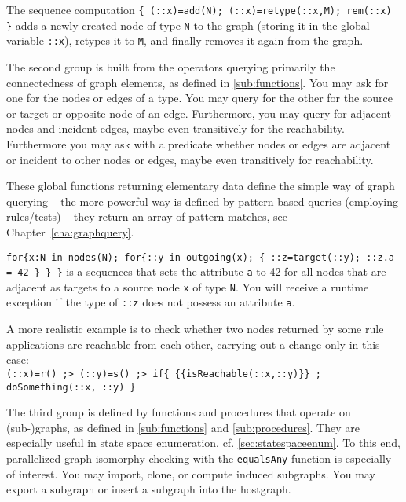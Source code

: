 \begin{example}
The sequence computation \verb#{ (::x)=add(N); (::x)=retype(::x,M); rem(::x) }# adds a newly created node of type \texttt{N} to the graph (storing it in the global variable \verb#::x#), retypes it to \texttt{M}, and finally removes it again from the graph.
\end{example}

The second group is built from the operators querying primarily the connectedness of graph elements,
as defined in \ref{sub:functions}.
You may ask for one for the nodes or edges of a type.
You may query for the other for the source or target or opposite node of an edge.
Furthermore, you may query for adjacent nodes and incident edges,
maybe even transitively for the reachability.
Furthermore you may ask with a predicate whether nodes or edges are adjacent or incident to other nodes or edges, maybe even transitively for reachability.

These global functions returning elementary data define the simple way of graph querying -- the more powerful way is defined by pattern based queries (employing rules/tests) -- they return an array of pattern matches, see Chapter~\ref{cha:graphquery}.

\begin{example}
\verb#for{x:N in nodes(N); for{::y in outgoing(x); { ::z=target(::y); ::z.a = 42 } } }# 
is a sequences that sets the attribute \texttt{a} to 42 for all nodes that are adjacent as targets to a source node \texttt{x} of type \texttt{N}.
You will receive a runtime exception if the type of \verb#::z# does not possess an attribute \texttt{a}.

A more realistic example is to check whether two nodes returned by some rule applications are reachable from each other, carrying out a change only in this case:\\
\verb#(::x)=r() ;> (::y)=s() ;> if{ {{isReachable(::x,::y)}} ; doSomething(::x, ::y) }#
\end{example}

The third group is defined by functions and procedures that operate on (sub-)graphs, as defined in \ref{sub:functions} and \ref{sub:procedures}.
They are especially useful in state space enumeration, cf. \ref{sec:statespaceenum}.
To this end, parallelized graph isomorphy checking with the \texttt{equalsAny} function is especially of interest.
You may import, clone, or compute induced subgraphs.
You may export a subgraph or insert a subgraph into the hostgraph.

